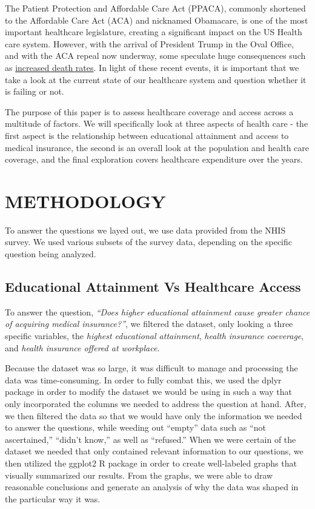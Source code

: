 \documentclass[10pt,]{article}
\begin{document}
The Patient Protection and Affordable Care Act (PPACA), commonly
shortened to the Affordable Care Act (ACA) and nicknamed Obamacare, is
one of the most important healthcare legislature, creating a significant
impact on the US Health care system. However, with the arrival of
President Trump in the Oval Office, and with the ACA repeal now
underway, some speculate huge consequences such as
\href{https://www.washingtonpost.com/posteverything/wp/2017/01/23/repealing-the-affordable-care-act-will-kill-more-than-43000-people-annually/?utm_term=.a2fbb24cd075}{increased
death rates}. In light of these recent events, it is important that we
take a look at the current state of our healthcare system and question
whether it is failing or not.

The purpose of this paper is to assess healthcare coverage and access
across a multitude of factors. We will specifically look at three
aspects of health care - the first aspect is the relationship between
educational attainment and access to medical insurance, the second is an
overall look at the population and health care coverage, and the final
exploration covers healthcare expenditure over the years.

\section{METHODOLOGY}\label{methodology}

To answer the questions we layed out, we use data provided from the NHIS
survey. We used various subsets of the survey data, depending on the
specific question being analyzed.

\subsection{\texorpdfstring{\textbf{Educational Attainment Vs Healthcare
Access}}{Educational Attainment Vs Healthcare Access}}\label{educational-attainment-vs-healthcare-access}

To answer the question, \emph{``Does higher educational attainment cause
greater chance of acquiring medical insurance?''}, we filtered the
dataset, only looking a three specific variables, the \emph{highest
educational attainment}, \emph{health insurance coeverage}, and
\emph{health insurance offered at workplace}.

Because the dataset was so large, it was difficult to manage and
processing the data was time-consuming. In order to fully combat this,
we used the dplyr package in order to modify the dataset we would be
using in such a way that only incorporated the columns we needed to
address the question at hand. After, we then filtered the data so that
we would have only the information we needed to answer the questions,
while weeding out ``empty'' data such as ``not ascertained,'' ``didn't
know,'' as well as ``refused.'' When we were certain of the dataset we
needed that only contained relevant information to our questions, we
then utilized the ggplot2 R package in order to create well-labeled
graphs that visually summarized our results. From the graphs, we were
able to draw reasonable conclusions and generate an analysis of why the
data was shaped in the particular way it was.
\end{document}
